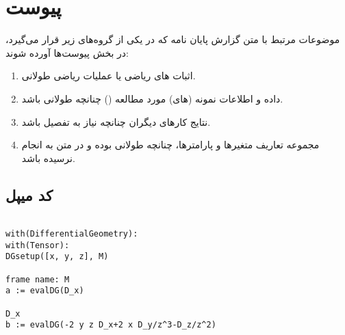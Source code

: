 \chapter*{‌پیوست}
موضوعات مرتبط با متن گزارش پایان نامه كه در يكی از گروه‌های زير قرار می‌گيرد، در بخش پيوست‌ها آورده شوند:
\begin{enumerate}
\item  اثبات های رياضی يا عمليات رياضی طولانی‌.‌
\item داده و اطلاعات نمونه (های) مورد مطالعه () چنانچه طولانی باشد‌.‌
\item نتايج كارهای ديگران چنانچه نياز به تفصيل باشد‌.‌

\item مجموعه تعاريف متغيرها و پارامترها، چنانچه طولانی بوده و در متن به انجام نرسيده باشد‌.‌
\end{enumerate}
\section*{کد میپل }
\begin{latin}
\begin{verbatim}

with(DifferentialGeometry):
with(Tensor):
DGsetup([x, y, z], M)
																	frame name: M
a := evalDG(D_x)
																	D_x
b := evalDG(-2 y z D_x+2 x D_y/z^3-D_z/z^2)


\end{verbatim}
\end{latin}